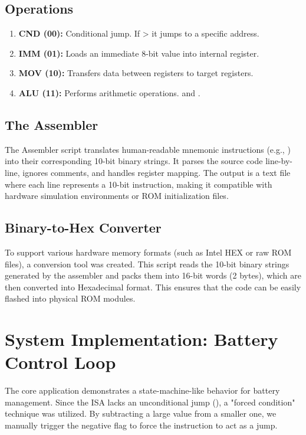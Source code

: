 \documentclass[12pt]{article}
\begin{document}
	\subsection{Operations}
	\begin{enumerate}
		\item \textbf{CND (00):} Conditional jump. If  >  it jumps to a specific address.
		\item \textbf{IMM (01):} Loads an immediate 8-bit value into  internal register.
		\item \textbf{MOV (10):} Transfers data between registers to target registers.
		\item \textbf{ALU (11):} Performs arithmetic operations.  and .
	\end{enumerate}

	\subsection{The Assembler}
	The Assembler script translates human-readable mnemonic instructions (e.g., ) into their corresponding 10-bit binary strings. It parses the source code line-by-line, ignores comments, and handles register mapping. The output is a text file where each line represents a 10-bit instruction, making it compatible with hardware simulation environments or ROM initialization files.
	
	\subsection{Binary-to-Hex Converter}
	To support various hardware memory formats (such as Intel HEX or raw ROM files), a conversion tool was created. This script reads the 10-bit binary strings generated by the assembler and packs them into 16-bit words (2 bytes), which are then converted into Hexadecimal format. This ensures that the code can be easily flashed into physical ROM modules.
	
	\section{System Implementation: Battery Control Loop}
	The core application demonstrates a state-machine-like behavior for battery management. Since the ISA lacks an unconditional jump (), a "forced condition" technique was utilized. By subtracting a large value from a smaller one, we manually trigger the negative flag to force the  instruction to act as a jump.
	
\end{document}
